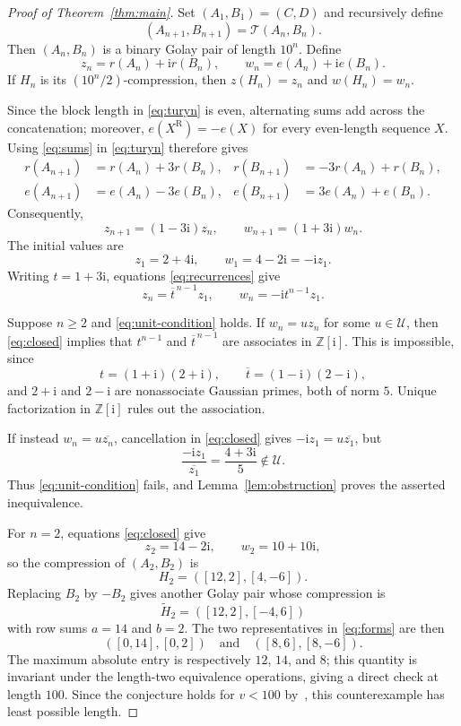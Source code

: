 \documentclass[11pt]{amsart}
\newcommand{\ii}{\mathrm{i}}
\newcommand{\rev}{\mathrm{R}}
\begin{document}
\begin{proof}[Proof of Theorem~\ref{thm:main}]
Set $(A_1,B_1)=(C,D)$ and recursively define
\[
(A_{n+1},B_{n+1})=\mathcal T(A_n,B_n).
\]
Then $(A_n,B_n)$ is a binary Golay pair of length $10^n$. Define
\[
z_n=r(A_n)+\ii r(B_n),
\qquad
w_n=e(A_n)+\ii e(B_n).
\]
If $H_n$ is its $(10^n/2)$-compression, then
$z(H_n)=z_n$ and $w(H_n)=w_n$.

Since the block length in \eqref{eq:turyn} is even, alternating
sums add across the concatenation; moreover,
$e(X^{\rev})=-e(X)$ for every even-length sequence $X$. Using
\eqref{eq:sums} in \eqref{eq:turyn} therefore gives
\[
\begin{aligned}
r(A_{n+1})&=r(A_n)+3r(B_n), &
r(B_{n+1})&=-3r(A_n)+r(B_n),\\
e(A_{n+1})&=e(A_n)-3e(B_n), &
e(B_{n+1})&=3e(A_n)+e(B_n).
\end{aligned}
\]
Consequently,
\begin{equation}\label{eq:recurrences}
z_{n+1}=(1-3\ii)z_n,
\qquad
w_{n+1}=(1+3\ii)w_n.
\end{equation}
The initial values are
\[
z_1=2+4\ii,
\qquad
w_1=4-2\ii=-\ii z_1.
\]
Writing $t=1+3\ii$, equations \eqref{eq:recurrences} give
\begin{equation}\label{eq:closed}
z_n=\overline t^{\,n-1}z_1,
\qquad
w_n=-\ii t^{n-1}z_1.
\end{equation}

Suppose $n\ge2$ and \eqref{eq:unit-condition} holds. If
$w_n=uz_n$ for some $u\in\mathcal U$, then \eqref{eq:closed} implies
that $t^{n-1}$ and $\overline t^{\,n-1}$ are associates in
$\mathbb Z[\ii]$. This is impossible, since
\[
t=(1+\ii)(2+\ii),
\qquad
\overline t=(1-\ii)(2-\ii),
\]
and $2+\ii$ and $2-\ii$ are nonassociate Gaussian primes, both of
norm $5$. Unique factorization in $\mathbb Z[\ii]$ rules out the
association.

If instead $w_n=u\overline{z_n}$, cancellation in
\eqref{eq:closed} gives $-\ii z_1=u\overline{z_1}$, but
\[
\frac{-\ii z_1}{\overline{z_1}}
=
\frac{4+3\ii}{5}
\notin\mathcal U.
\]
Thus \eqref{eq:unit-condition} fails, and
Lemma~\ref{lem:obstruction} proves the asserted inequivalence.

For $n=2$, equations \eqref{eq:closed} give
\[
z_2=14-2\ii,
\qquad
w_2=10+10\ii,
\]
so the compression of $(A_2,B_2)$ is
\[
H_2=([12,2],[4,-6]).
\]
Replacing $B_2$ by $-B_2$ gives another Golay pair whose compression is
\[
\widetilde H_2=([12,2],[-4,6])
\]
with row sums $a=14$ and $b=2$. The two representatives in
\eqref{eq:forms} are then
\[
([0,14],[0,2])
\quad\text{and}\quad
([8,6],[8,-6]).
\]
The maximum absolute entry is respectively $12$, $14$, and $8$;
this quantity is invariant under the length-two equivalence
operations, giving a direct check at length $100$. Since the
conjecture holds for $v<100$ by~\cite{LKB}, this counterexample has
least possible length.
\end{proof}
\end{document}
